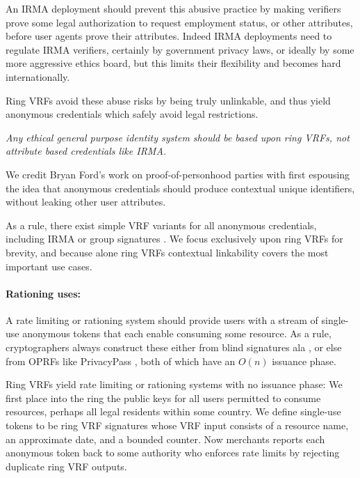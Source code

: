 An IRMA deployment should prevent this abusive practice by making
verifiers prove some legal authorization to request employment status,
or other attributes, before user agents prove their attributes.
Indeed IRMA deployments need to regulate IRMA verifiers, certainly by
government privacy laws, or ideally by some more aggressive ethics board,
but this limits their flexibility and becomes hard internationally.

Ring VRFs avoid these abuse risks by being truly unlinkable, and thus
yield anonymous credentials which safely avoid legal restrictions.

{\it Any ethical general purpose identity system should be based
upon ring VRFs, not attribute based credentials like IRMA.}

We credit Bryan Ford's work on proof-of-personhood parties \cite{pop2008,pop2017}
with first espousing the idea that anonymous credentials should produce
contextual unique identifiers, without leaking other user attributes.

As a rule, there exist simple VRF variants for all anonymous credentials,
including IRMA \cite{IRMAcredentials} or group signatures \cite{group_sig_survey}.
We focus exclusively upon ring VRFs for brevity, and because alone
ring VRFs contextual linkability covers the most important use cases.

\paragraph{Rationing uses:}

A rate limiting or rationing system should provide users with a stream
of single-use anonymous tokens that each enable consuming some resource.
As a rule, cryptographers always construct these either
 from blind signatures ala \cite{chaum83}, or else
 from OPRFs like PrivacyPass \cite{PrivacyPass},
both of which have an $O(n)$ issuance phase.

Ring VRFs yield rate limiting or rationing systems with no issuance phase:\quad 
We first place into the ring the public keys for all users permitted to
consume resources, perhaps all legal residents within some country.  
We define single-use tokens to be ring VRF signatures whose VRF input
consists of a resource name, an approximate date, and a bounded counter.
Now merchants reports each anonymous token back to some authority who
enforces rate limits by rejecting duplicate ring VRF outputs.

